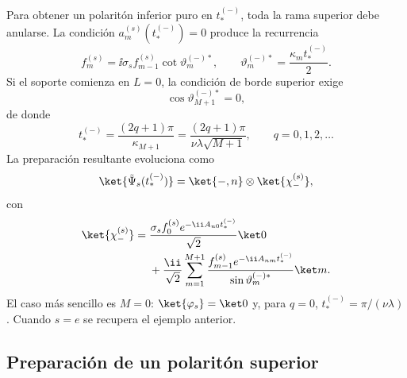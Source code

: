 Para obtener un polarit\'on inferior puro en $t_*^{(-)}$, toda la rama
superior debe anularse. La condici\'on $a_m^{(s)}(t_*^{(-)})=0$ produce la
recurrencia
\begin{equation}
  \boxed{
  f_m^{(s)}
  =
  \ii\sigma_s f_{m-1}^{(s)}
  \cot\vartheta_m^{(-)*},
  \qquad
  \vartheta_m^{(-)*}
  =
  \frac{\kappa_m t_*^{(-)}}{2}.
  }
\end{equation}
Si el soporte comienza en $L=0$, la condici\'on de borde superior exige
\begin{equation}
  \cos\vartheta_{M+1}^{(-)*}=0,
\end{equation}
de donde
\begin{equation}
  \boxed{
  t_*^{(-)}
  =
  \frac{(2q+1)\pi}{\kappa_{M+1}}
  =
  \frac{(2q+1)\pi}{\nu\lambda\sqrt{M+1}},
  \qquad q=0,1,2,\ldots
  }
\end{equation}
La preparaci\'on resultante evoluciona como
\begin{equation}
  \ket{\tilde\Psi_s(t_*^{(-)})}
  =
  \ket{-,n}\otimes\ket{\chi_-^{(s)}},
\end{equation}
con
\begin{equation}
\begin{aligned}
  \ket{\chi_-^{(s)}}
  ={}&
  \frac{\sigma_s f_0^{(s)}e^{-\ii A_{n0}t_*^{(-)}}}{\sqrt2}\ket 0
  \\
  &+
  \frac{\ii}{\sqrt2}
  \sum_{m=1}^{M+1}
  \frac{f_{m-1}^{(s)}e^{-\ii A_{nm}t_*^{(-)}}}
  {\sin\vartheta_m^{(-)*}}\ket m.
\end{aligned}
\end{equation}
El caso m\'as sencillo es $M=0$: $\ket{\varphi_s}=\ket 0$ y, para $q=0$,
$t_*^{(-)}=\pi/(\nu\lambda)$. Cuando $s=e$ se recupera el ejemplo anterior.

\subsection{Preparaci\'on de un polarit\'on superior}

